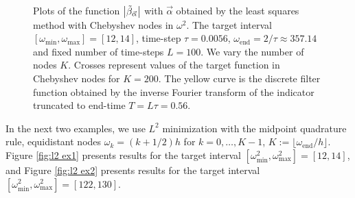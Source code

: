 \documentclass[a4paper,11pt,bibliography=totoc,listof=totoc,headinclude=true,cleardoublepage=empty,oneside]{scrbook}
\newcommand{\dffv}{\Tilde{\beta}_{\Vec{\alpha}}}
\newcommand{\e}{\mathrm{end}}
\begin{document}
\begin{figure}[h]
    \caption{Plots of the function $\left|\dffv\right|$ with $\Vec{\alpha}$ obtained by the least squares method with Chebyshev nodes in $\omega^2$. The target interval $\left[\omega_{\min}, \omega_{\max} \right] = [12, 14]$, time-step $\tau = 0.0056$, $\omega_\e = 2/\tau \approx 357.14$ and fixed number of time-steps $L=100$. We vary the number of nodes $K$. Crosses represent values of the target function in Chebyshev nodes for $K=200$. The yellow curve is the discrete filter function obtained by the inverse Fourier transform of the indicator truncated to end-time $T=L\tau = 0.56$.}
    \label{fig:cheb least sq}
\end{figure}


In the next two examples, we use $L^2$ minimization with the midpoint quadrature rule, equidistant nodes $\omega_k = (k+1/2)h$ for $k=0,\dots, K-1$, $K:= \lfloor\omega_\e/h\rfloor$. Figure \ref{fig:l2 ex1} presents results for the target interval $\left[\omega_{\min}^2, \omega_{\max}^2\right] = [12, 14]$, and Figure \ref{fig:l2 ex2} presents results for the target interval $\left[\omega_{\min}^2, \omega_{\max}^2\right] = [122, 130]$.
\end{document}
